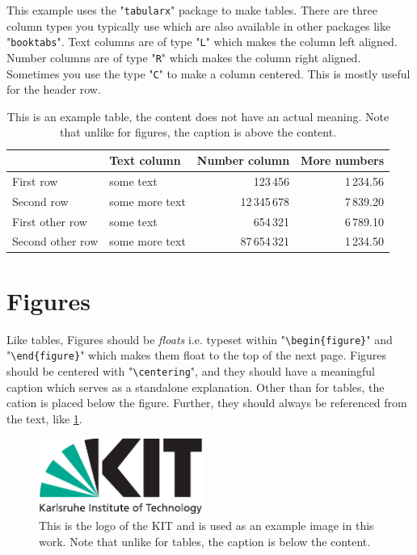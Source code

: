This example uses the "\texttt{tabularx}" package to make tables.
There are three column types you typically use which are also available in other packages like "\texttt{booktabs}".
Text columns are of type "\texttt{L}" which makes the column left aligned.
Number columns are of type "\texttt{R}" which makes the column right aligned.
Sometimes you use the type "\texttt{C}" to make a column centered.
This is mostly useful for the header row.

\begin{table}[t]
	\caption{This is an example table, the content does not have an actual meaning.
		Note that unlike for figures, the caption is above the content.
		\label{tb:Example:Tables}}
	\begin{tabularx}{\linewidth}{LLRR}
		\toprule
		& Text column & Number column & More numbers \\
		\midrule
		First row & some text & 123\,456 & 1\,234.56 \\
		Second row & some more text & 12\,345\,678 & 7\,839.20 \\
		\addlinespace
		First other row & some text & 654\,321 & 6\,789.10 \\
		Second other row & some more text & 87\,654\,321 & 1\,234.50 \\
		\bottomrule
	\end{tabularx}
\end{table}


\section{Figures}
\label{sec:Example:Figures}
Like tables, Figures should be \emph{floats} i.e. typeset within "\texttt{\textbackslash{}begin\{figure\}}" and "\texttt{\textbackslash{}end\{figure\}}" which makes them float to the top of the next page.
Figures should be centered with "\texttt{\textbackslash{}centering}",
and they should have a meaningful caption which serves as a standalone explanation.
Other than for tables, the cation is placed below the figure.
Further, they should always be referenced from the text, like \cref{fig:Example:figure}.

\begin{figure}[t]
	\centering
	\includegraphics[height=2.5cm]{logos/kitlogo_en_cmyk.pdf}
	\caption{This is the logo of the KIT and is used as an example image in this work.
	Note that unlike for tables, the caption is below the content.
	\label{fig:Example:figure}}
\end{figure}


